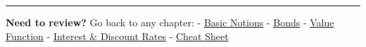 \documentclass[
  letterpaper,
]{scrbook}
\begin{document}
\begin{center}\rule{0.5\linewidth}{0.5pt}\end{center}

\textbf{Need to review?} Go back to any chapter: -
\hyperref[basic-notions]{Basic Notions} - \hyperref[bonds]{Bonds} -
\hyperref[value-function]{Value Function} -
\hyperref[interest-discount-rates]{Interest \& Discount Rates} -
\hyperref[cheat-sheet]{Cheat Sheet}


\backmatter
\end{document}
